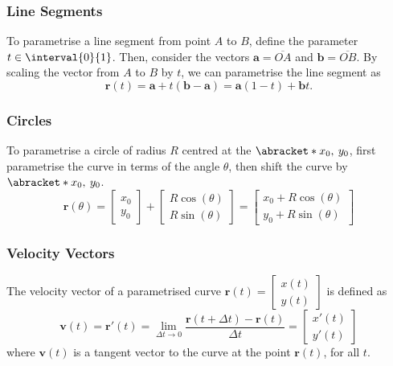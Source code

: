 \documentclass{article}
\begin{document}
\subsubsection{Line Segments}
To parametrise a line segment from point \(A\) to \(B\), define the parameter \(t \in \interval{0}{1}\).
Then, consider the vectors \(\symbf{a} = \overline{OA}\) and \(\symbf{b} = \overline{OB}\).
By scaling the vector from \(A\) to \(B\) by \(t\), we can parametrise the line segment as
\begin{equation*}
    \symbf{r}\left( t \right) = \symbf{a} + t \left( \symbf{b} - \symbf{a} \right) = \symbf{a} \left( 1 - t \right) + \symbf{b} t.
\end{equation*}
\subsubsection{Circles}
To parametrise a circle of radius \(R\) centred at the \(\abracket*{x_0,\: y_0}\),
first parametrise the curve in terms of the angle \(\theta\), then shift the curve by \(\abracket*{x_0,\: y_0}\).
\begin{equation*}
    \symbf{r}\left( \theta \right) =
    \begin{bmatrix}
        x_0 \\
        y_0
    \end{bmatrix} +
    \begin{bmatrix}
        R \cos{\left( \theta \right)} \\
        R \sin{\left( \theta \right)}
    \end{bmatrix}
    =
    \begin{bmatrix}
        x_0 + R \cos{\left( \theta \right)} \\
        y_0 + R \sin{\left( \theta \right)}
    \end{bmatrix}
\end{equation*}
\subsubsection{Velocity Vectors}
The velocity vector of a parametrised curve \(\symbf{r}\left( t \right) = \begin{bmatrix}
    x\left( t \right) \\
    y\left( t \right)
\end{bmatrix}\) is defined as
\begin{equation*}
    \symbf{v}\left( t \right) = \symbf{r}'\left( t \right) = \lim_{\Delta t \to 0} \frac{\symbf{r}\left( t + \Delta t \right) - \symbf{r}\left( t \right)}{\Delta t} =
    \begin{bmatrix}
        x'\left( t \right) \\
        y'\left( t \right)
    \end{bmatrix}
\end{equation*}
where \(\symbf{v}\left( t \right)\) is a tangent vector to the curve at the point \(\symbf{r}\left( t \right)\), for all \(t\).
\end{document}
